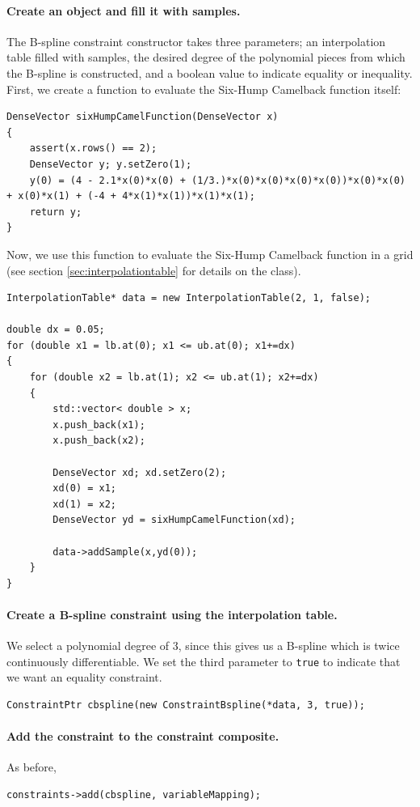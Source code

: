 \paragraph{Create an  object and fill it with samples.} The B-spline constraint constructor takes three parameters; an interpolation table filled with samples, the desired degree of the polynomial pieces from which the B-spline is constructed, and a boolean value to indicate equality or inequality. First, we create a function to evaluate the Six-Hump Camelback function itself:
\begin{lstlisting}
DenseVector sixHumpCamelFunction(DenseVector x)
{
    assert(x.rows() == 2);
    DenseVector y; y.setZero(1);
    y(0) = (4 - 2.1*x(0)*x(0) + (1/3.)*x(0)*x(0)*x(0)*x(0))*x(0)*x(0) + x(0)*x(1) + (-4 + 4*x(1)*x(1))*x(1)*x(1);
    return y;
}
\end{lstlisting}
Now, we use this function to evaluate the Six-Hump Camelback function in a grid (see section \ref{sec:interpolationtable} for details on the  class).
\begin{lstlisting}
InterpolationTable* data = new InterpolationTable(2, 1, false);

double dx = 0.05;
for (double x1 = lb.at(0); x1 <= ub.at(0); x1+=dx)
{
	for (double x2 = lb.at(1); x2 <= ub.at(1); x2+=dx)
	{
		std::vector< double > x;
		x.push_back(x1);
		x.push_back(x2);

		DenseVector xd; xd.setZero(2);
		xd(0) = x1;
		xd(1) = x2;
		DenseVector yd = sixHumpCamelFunction(xd);

		data->addSample(x,yd(0));
	}
}
\end{lstlisting}

\paragraph{Create a B-spline constraint using the interpolation table.} We select a polynomial degree of 3, since this gives us a B-spline which is twice continuously differentiable. We set the third parameter to \texttt{true} to indicate that we want an equality constraint.
\begin{lstlisting}
ConstraintPtr cbspline(new ConstraintBspline(*data, 3, true));
\end{lstlisting}

\paragraph{Add the constraint to the constraint composite.} As before,
\begin{lstlisting}
constraints->add(cbspline, variableMapping);
\end{lstlisting}


